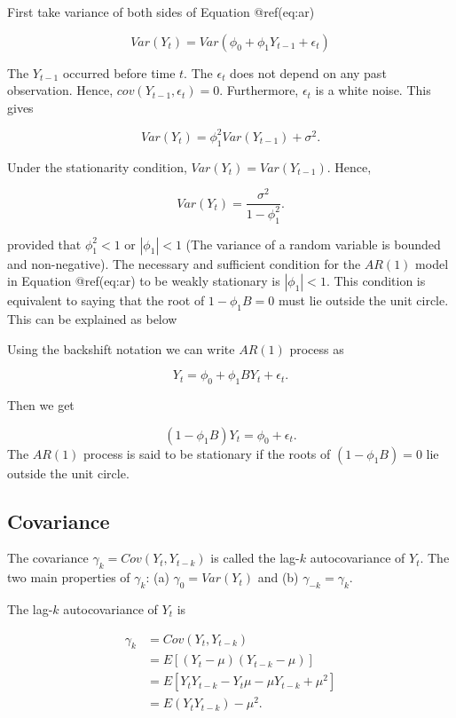 \documentclass[
  11pt,
  a4paper,
]{report}
\begin{document}
First take variance of both sides of Equation @ref(eq:ar)

\[Var(Y_t)=Var(\phi_0+\phi_1 Y_{t-1}+\epsilon_t)\]

The \(Y_{t-1}\) occurred before time \(t\). The \(\epsilon_t\) does not
depend on any past observation. Hence, \(cov(Y_{t-1}, \epsilon_t)= 0\).
Furthermore, \({\epsilon_t}\) is a white noise. This gives

\[Var(Y_t)=\phi_1^2 Var(Y_{t-1})+\sigma^2.\]

Under the stationarity condition, \(Var(Y_t)=Var(Y_{t-1})\). Hence,

\[Var(Y_t)=\frac{\sigma^2}{1-\phi_1^2}.\]

provided that \(\phi_1^2 < 1\) or \(|\phi_1| < 1\) (The variance of a
random variable is bounded and non-negative). The necessary and
sufficient condition for the \(AR(1)\) model in Equation @ref(eq:ar) to
be weakly stationary is \(|\phi_1| < 1\). This condition is equivalent
to saying that the root of \(1-\phi_1B = 0\) must lie outside the unit
circle. This can be explained as below

Using the backshift notation we can write \(AR(1)\) process as

\[Y_t = \phi_0 + \phi_1BY_{t} + \epsilon_t.\]

Then we get

\[(1-\phi_1B)Y_t=\phi_0 + \epsilon_t.\] The \(AR(1)\) process is said to
be stationary if the roots of \((1-\phi_1B)=0\) lie outside the unit
circle.

\subsection{Covariance}\label{covariance}

The covariance \(\gamma_k=Cov(Y_t, Y_{t-k})\) is called the lag-\(k\)
autocovariance of \(Y_t\). The two main properties of \(\gamma_k\): (a)
\(\gamma_0=Var(Y_t)\) and (b) \(\gamma_{-k}=\gamma_{k}\).

The lag-\(k\) autocovariance of \(Y_t\) is

\begin{equation}
\begin{aligned}
  \gamma_k &= Cov(Y_t, Y_{t-k}) \\
         &= E[(Y_t-\mu)(Y_{t-k}-\mu)] \\
         &= E[Y_tY_{t-k}-Y_t\mu-\mu Y_{t-k} +\mu^2] \\
         &= E(Y_t Y_{t-k}) - \mu^2. \\
\end{aligned}
\end{equation}
\end{document}
